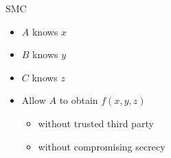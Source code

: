 \documentclass{beamer}
\begin{document}
\begin{frame}{SMC}
  \begin{itemize}
      \item $A$ knows $x$
      \item $B$ knows $y$
      \item $C$ knows $z$
      \item Allow $A$ to obtain $f(x,y,z)$
        \begin{itemize}
          \item without trusted third party
          \item without compromising secrecy
        \end{itemize}
  \end{itemize}
\end{frame}
\end{document}
